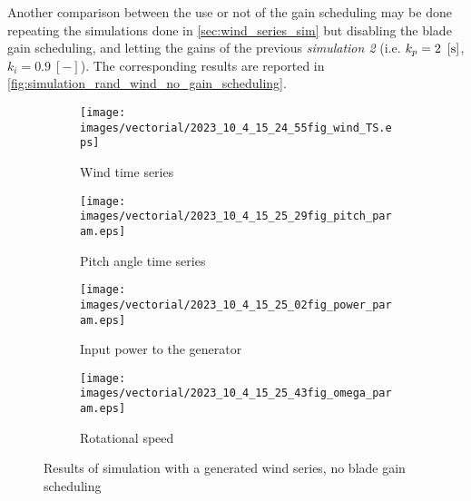 Another comparison between the use or not of the gain scheduling may be done repeating the simulations done in \autoref{sec:wind_series_sim} but disabling the blade gain scheduling, and letting the gains of the previous \textit{simulation 2} (i.e. $k_p = 2 \ \left[\si{\second}\right]$, $k_i=0.9 \ [-]$). The corresponding results are reported in \autoref{fig:simulation_rand_wind_no_gain_scheduling}.
\begin{figure}[htb]
  \begin{subfigure}{0.5\columnwidth}
    \centering
    \texttt{[image: images/vectorial/2023\_10\_4\_15\_24\_55fig\_wind\_TS.eps]}
    \caption{Wind time series}
    \label{fig:2023_05_8_22_43_35fig_wind_TS.eps}
  \end{subfigure}
  \begin{subfigure}{0.5\columnwidth}
    \centering
    \texttt{[image: images/vectorial/2023\_10\_4\_15\_25\_29fig\_pitch\_param.eps]}
    \caption{Pitch angle time series}
    \label{fig:2023_05_8_22_44_05fig_pitch_param}
  \end{subfigure}
  \begin{subfigure}{0.5\columnwidth}
    \centering
    \texttt{[image: images/vectorial/2023\_10\_4\_15\_25\_02fig\_power\_param.eps]}
    \caption{Input power to the generator}
    \label{fig:2023_05_8_22_44_15fig_power_param}
  \end{subfigure}
  \begin{subfigure}{0.5\columnwidth}
    \centering
    \texttt{[image: images/vectorial/2023\_10\_4\_15\_25\_43fig\_omega\_param.eps]}
    \caption{Rotational speed}
    \label{fig:2023_05_8_23_17_57fig_omega_param}
  \end{subfigure}
  \caption{Results of simulation with a generated wind series, no blade gain scheduling}
  \label{fig:simulation_rand_wind_no_gain_scheduling}
\end{figure}

